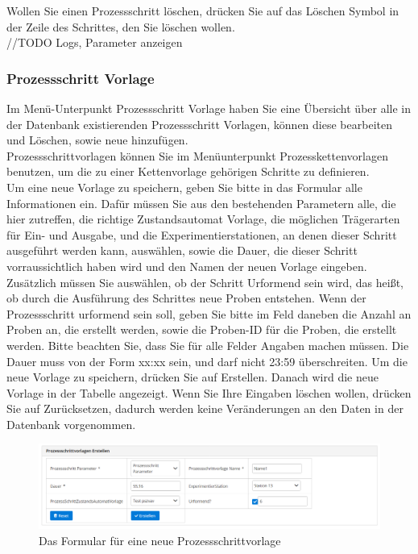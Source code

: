 \documentclass[enabledeprecatedfontcommands,fontsize=12pt,paper=a4,twoside]{scrartcl}
\begin{document}
Wollen Sie einen Prozessschritt löschen, drücken Sie auf das Löschen Symbol in der Zeile des Schrittes, den Sie löschen wollen. \\

//TODO Logs, Parameter anzeigen
\subsubsection{Prozessschritt Vorlage}

Im Menü-Unterpunkt Prozessschritt Vorlage haben Sie eine Übersicht über alle in der Datenbank existierenden Prozessschritt Vorlagen, können diese bearbeiten und Löschen, sowie neue hinzufügen. \\

Prozessschrittvorlagen können Sie im Menüunterpunkt Prozesskettenvorlagen benutzen, um die zu einer Kettenvorlage gehörigen Schritte zu definieren. \\

Um eine neue Vorlage zu speichern, geben Sie bitte in das Formular alle Informationen ein. Dafür müssen Sie aus den bestehenden Parametern alle, die hier zutreffen, die richtige Zustandsautomat Vorlage, die möglichen Trägerarten für Ein- und Ausgabe, und die Experimentierstationen, an denen dieser Schritt ausgeführt werden kann, auswählen, sowie die Dauer, die dieser Schritt vorraussichtlich haben wird und den Namen der neuen Vorlage eingeben. Zusätzlich müssen Sie auswählen, ob der Schritt Urformend sein wird, das heißt, ob durch die Ausführung des Schrittes neue Proben entstehen. Wenn der Prozessschritt urformend sein soll, geben Sie bitte im Feld daneben die Anzahl an Proben an, die erstellt werden, sowie die Proben-ID für die Proben, die erstellt werden. Bitte beachten Sie, dass Sie für alle Felder Angaben machen müssen. Die Dauer muss von der Form xx:xx sein, und darf nicht 23:59 überschreiten. Um die neue Vorlage zu speichern, drücken Sie auf Erstellen. Danach wird die neue Vorlage in der Tabelle angezeigt. Wenn Sie Ihre Eingaben löschen wollen, drücken Sie auf Zurücksetzen, dadurch werden keine Veränderungen an den Daten in der Datenbank vorgenommen. \\

\begin{figure}[h!]
\begin{center}
 \includegraphics[width=\textwidth]{screenshots/pk/prozessschrittvorlageformular.png}
  \caption{Das Formular für eine neue Prozessschrittvorlage}
  \label{fig:boat2}
\end{center}
\end{figure}
\end{document}
